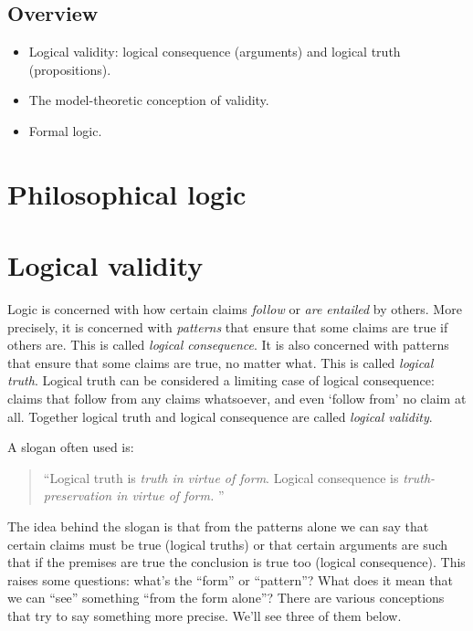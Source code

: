 \documentclass[../../../include/open-logic-part]{subfiles}
\begin{document}


\begin{overview}

\section*{Overview}

\begin{itemize} 
	\item Logical validity: logical consequence
(arguments) and logical truth (propositions). 
	\item The model-theoretic conception of validity. 
	\item Formal logic.
\end{itemize}

\end{overview}

\section{Philosophical logic}

\section{Logical validity}

Logic is concerned with how certain claims \emph{follow} or \emph{are
entailed} by others. More precisely, it is concerned with
\emph{patterns} that ensure that some claims are true if others are.
This is called \emph{logical consequence}. It is also concerned with
patterns that ensure that some claims are true, no matter what. This
is called \emph{logical truth}. Logical truth can be considered a
limiting case of logical consequence: claims that follow from any
claims whatsoever, and even `follow from' no claim at all. Together
logical truth and logical consequence are called \emph{logical
validity}.

A slogan often used is: \begin{quote} ``Logical truth is \emph{truth
in virtue of form}. Logical consequence is \emph{truth-preservation in
virtue of form. }''  \end{quote}

The idea behind the slogan is that from the patterns alone we can say
that certain claims must be true (logical truths) or that certain
arguments are such that if the premises are true the conclusion is
true too (logical consequence). This raises some questions: what's the
``form'' or ``pattern''? What does it mean that we can ``see''
something ``from the form alone''? There are various conceptions that
try to say something more precise. We'll see three of them below.  
\end{document}
